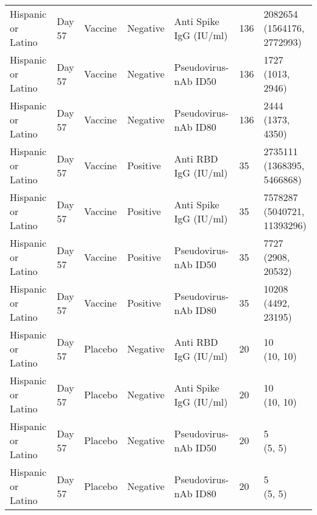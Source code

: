 \documentclass[]{book}
\theoremstyle{definition}
\theoremstyle{definition}
\theoremstyle{definition}
\newcommand{\1}{\mathbbm{1}}
\begin{document}
\begin{landscape}
\begin{ThreePartTable}
\begin{longtable}[t]{>{\raggedright\arraybackslash}p{7cm}llllll}
\hspace{1em}Hispanic or Latino & Day 57 & Vaccine & Negative & Anti Spike IgG (IU/ml) & 136 & \makecell[l]{2082654\\(1564176, 2772993)}\\
\hspace{1em}Hispanic or Latino & Day 57 & Vaccine & Negative & Pseudovirus-nAb ID50 & 136 & \makecell[l]{1727\\(1013, 2946)}\\
\hspace{1em}Hispanic or Latino & Day 57 & Vaccine & Negative & Pseudovirus-nAb ID80 & 136 & \makecell[l]{2444\\(1373, 4350)}\\
\hspace{1em}Hispanic or Latino & Day 57 & Vaccine & Positive & Anti RBD IgG (IU/ml) & 35 & \makecell[l]{2735111\\(1368395, 5466868)}\\
\hspace{1em}Hispanic or Latino & Day 57 & Vaccine & Positive & Anti Spike IgG (IU/ml) & 35 & \makecell[l]{7578287\\(5040721, 11393296)}\\
\hspace{1em}Hispanic or Latino & Day 57 & Vaccine & Positive & Pseudovirus-nAb ID50 & 35 & \makecell[l]{7727\\(2908, 20532)}\\
\hspace{1em}Hispanic or Latino & Day 57 & Vaccine & Positive & Pseudovirus-nAb ID80 & 35 & \makecell[l]{10208\\(4492, 23195)}\\
\hspace{1em}Hispanic or Latino & Day 57 & Placebo & Negative & Anti RBD IgG (IU/ml) & 20 & \makecell[l]{10\\(10, 10)}\\
\hspace{1em}Hispanic or Latino & Day 57 & Placebo & Negative & Anti Spike IgG (IU/ml) & 20 & \makecell[l]{10\\(10, 10)}\\
\hspace{1em}Hispanic or Latino & Day 57 & Placebo & Negative & Pseudovirus-nAb ID50 & 20 & \makecell[l]{5\\(5, 5)}\\
\hspace{1em}Hispanic or Latino & Day 57 & Placebo & Negative & Pseudovirus-nAb ID80 & 20 & \makecell[l]{5\\(5, 5)}\\

\end{longtable}
\end{ThreePartTable}
\end{landscape}
\end{document}
